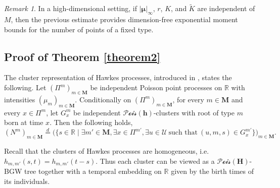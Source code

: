 \documentclass[reqno,final,11pt]{amsart}
\renewcommand{\cite}{\citet}
\theoremstyle{plain}
\theoremstyle{definition}
\theoremstyle{remark}
\newtheorem{remark}[theorem]{Remark}
\newcommand{\R}{\mathds{R}}
\newcommand{\M}{\bm{M}}
\newcommand{\h}{\bm{h}}
\renewcommand{\H}{\bm{H}}
\newcommand{\U}{\mathcal{U}}
\newcommand{\Pois}{\mathscr{P}\!\mathscr{o}\!\mathscr{i}\!\mathscr{s}}
\begin{document}
\begin{remark}\label{remark3.14}
	In a high-dimensional setting, if $\vert\bm{\mu}\vert_\infty$, $r$, $K$, and $\tilde K$ are independent of $M$, then the previous estimate provides dimension-free exponential moment bounds for the number of points of a fixed type.
\end{remark}

\subsection{Proof of Theorem \ref{theorem2}}\label{section3.4}

The cluster representation of Hawkes processes, introduced in \cite{hawkes_cluster_1974}, states the following. Let $(\Pi^m)_{m\in\M}$ be independent Poisson point processes on $\R$ with intensities $(\mu_m)_{m\in\M}$. Conditionally on $(\Pi^m)_{m\in\M}$, for every $m\in\M$ and every $x\in\Pi^m$, let $G_x^m$ be independent $\Pois(\h)$-clusters with root of type $m$ born at time $x$. Then the following holds,
\begin{equation}\label{cluster rep}
	(N^m)_{m\in\M} \overset{d}{=} \big(\{ s\in\R \mid \exists m'\in\M, \exists x\in\Pi^{m'}, \exists u\in \U \ \text{such that} \ (u,m,s)\in G^{m'}_x\}\big)_{m\in\M}.
\end{equation}

Recall that the clusters of Hawkes processes are homogeneous, i.e. $h_{m,m'}(s,t) = h_{m,m'}(t-s)$. Thus each cluster can be viewed as a $\Pois(\H)$-BGW tree together with a temporal embedding on $\R$ given by the birth times of its individuals.
\end{document}
